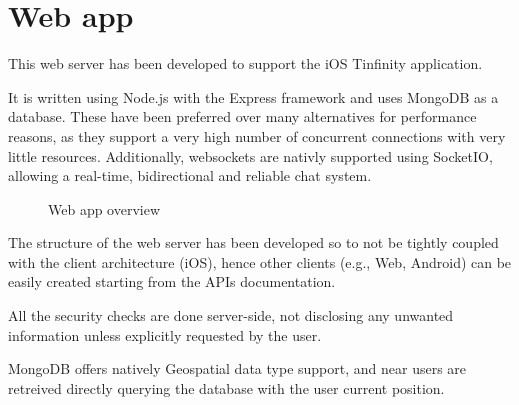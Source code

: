  
\section{Web app}
This web server has been developed to support the iOS Tinfinity application. 

It is written using Node.js with the Express framework and uses MongoDB as a database. These have been preferred over many alternatives for performance reasons, as they support a very high number of concurrent connections with very little resources. Additionally, websockets are nativly supported using SocketIO, allowing a real-time, bidirectional and reliable chat system.

\begin{figure}[H]
\caption{Web app overview}
\end{figure}

The structure of the web server has been developed so to not be tightly coupled with the client architecture (iOS), hence other clients (e.g., Web, Android) can be easily created starting from the APIs documentation.

All the security checks are done server-side, not disclosing any unwanted information unless explicitly requested by the user.

MongoDB offers natively Geospatial data type support, and near users are retreived directly querying the database with the user current position.